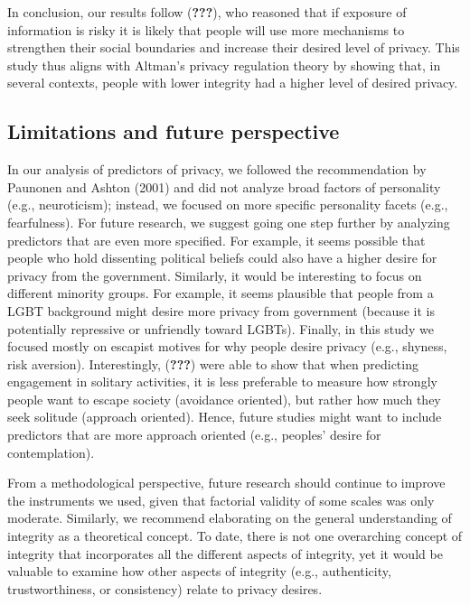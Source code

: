 \documentclass[man]{apa6}
\theoremstyle{definition}
\theoremstyle{definition}
\theoremstyle{definition}
\theoremstyle{remark}
\begin{document}
In conclusion, our results follow ({\textbf{???}}), who reasoned that if
exposure of information is risky it is likely that people will use more
mechanisms to strengthen their social boundaries and increase their
desired level of privacy. This study thus aligns with Altman's privacy
regulation theory by showing that, in several contexts, people with
lower integrity had a higher level of desired privacy.

\hypertarget{limitations-and-future-perspective}{%
\subsection{Limitations and future
perspective}\label{limitations-and-future-perspective}}

In our analysis of predictors of privacy, we followed the recommendation
by Paunonen and Ashton (2001) and did not analyze broad factors of
personality (e.g., neuroticism); instead, we focused on more specific
personality facets (e.g., fearfulness). For future research, we suggest
going one step further by analyzing predictors that are even more
specified. For example, it seems possible that people who hold
dissenting political beliefs could also have a higher desire for privacy
from the government. Similarly, it would be interesting to focus on
different minority groups. For example, it seems plausible that people
from a LGBT background might desire more privacy from government
(because it is potentially repressive or unfriendly toward LGBTs).
Finally, in this study we focused mostly on escapist motives for why
people desire privacy (e.g., shyness, risk aversion). Interestingly,
({\textbf{???}}) were able to show that when predicting engagement in
solitary activities, it is less preferable to measure how strongly
people want to escape society (avoidance oriented), but rather how much
they seek solitude (approach oriented). Hence, future studies might want
to include predictors that are more approach oriented (e.g., peoples'
desire for contemplation).

From a methodological perspective, future research should continue to
improve the instruments we used, given that factorial validity of some
scales was only moderate. Similarly, we recommend elaborating on the
general understanding of integrity as a theoretical concept. To date,
there is not one overarching concept of integrity that incorporates all
the different aspects of integrity, yet it would be valuable to examine
how other aspects of integrity (e.g., authenticity, trustworthiness, or
consistency) relate to privacy desires.
\end{document}
